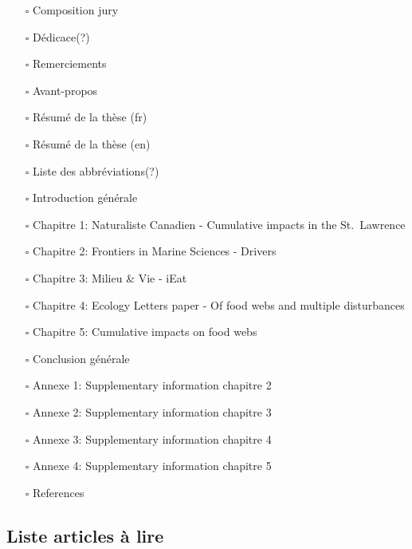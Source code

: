 \begin{itemize}
\tightlist
\item[$\square$]
  Composition jury
\item[$\square$]
  Dédicace(?)
\item[$\square$]
  Remerciements
\item[$\square$]
  Avant-propos
\item[$\square$]
  Résumé de la thèse (fr)
\item[$\square$]
  Résumé de la thèse (en)
\item[$\square$]
  Liste des abbréviations(?)
\item[$\square$]
  Introduction générale
\item[$\square$]
  Chapitre 1: Naturaliste Canadien - Cumulative impacts in the
  St.~Lawrence
\item[$\square$]
  Chapitre 2: Frontiers in Marine Sciences - Drivers
\item[$\square$]
  Chapitre 3: Milieu \& Vie - iEat
\item[$\square$]
  Chapitre 4: Ecology Letters paper - Of food webs and multiple
  disturbances
\item[$\square$]
  Chapitre 5: Cumulative impacts on food webs
\item[$\square$]
  Conclusion générale
\item[$\square$]
  Annexe 1: Supplementary information chapitre 2
\item[$\square$]
  Annexe 2: Supplementary information chapitre 3
\item[$\square$]
  Annexe 3: Supplementary information chapitre 4
\item[$\square$]
  Annexe 4: Supplementary information chapitre 5
\item[$\square$]
  References
\end{itemize}

\hypertarget{liste-articles-uxe0-lire}{%
\subsection*{Liste articles à lire}\label{liste-articles-uxe0-lire}}

